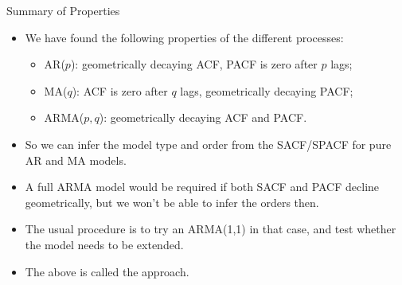 \begin{frame}{Summary of Properties}
\begin{itemize}
\item We have found the following properties of the different processes:
\begin{itemize}
\item AR($p$): geometrically decaying ACF, PACF is zero after $p$ lags;

\item MA($q$): ACF is zero after $q$ lags, geometrically decaying PACF;

\item ARMA($p, q$): geometrically decaying ACF and PACF.
\end{itemize}
\item So we can infer the model type and order from the SACF/SPACF for pure AR and MA models.
\item A full ARMA model would be required if both SACF and PACF decline geometrically, but we won't be able to infer the orders then.
\item The usual procedure is to try an  ARMA(1,1) in that case, and test whether the model needs to be extended.
\item The above is called the  approach.
\end{itemize}
\end{frame}

